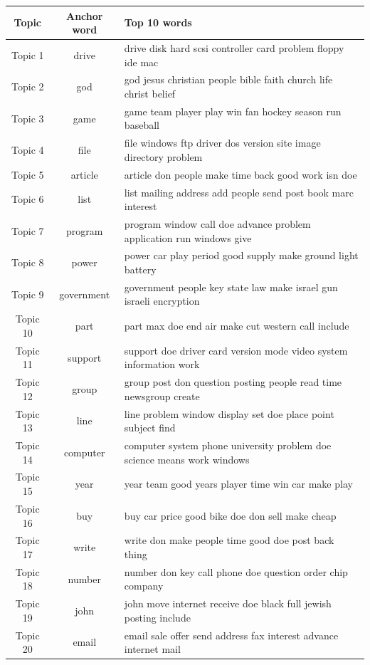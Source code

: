 \documentclass{article}
\begin{document}
\begin{table}[h]
   \begin{center}
  \begin{tabular}{|c|c|l|} \hline
           Topic & Anchor word & Top 10 words \\ \hline
Topic	1	&	drive & drive disk hard scsi controller card problem floppy ide mac	\\ \hline
Topic	2	&	god & god jesus christian people bible faith church life christ belief	\\ \hline
Topic	3	&	game & game team player play win fan hockey season run baseball	\\ \hline
Topic	4	&	file & file windows ftp driver dos version site image directory problem	\\ \hline
Topic	5	&	article & article don people make time back good work isn doe	\\ \hline
Topic	6	&	list & list mailing address add people send post book marc interest	\\ \hline
Topic	7	&	program & program window call doe advance problem application run windows give	\\ \hline
Topic	8	&	power & power car play period good supply make ground light battery	\\ \hline
Topic	9	&	government & government people key state law make israel gun israeli encryption	\\ \hline
Topic	10	&	part & part max doe end air make cut western call include	\\ \hline
Topic	11	&	support & support doe driver card version mode video system information work	\\ \hline
Topic	12	&	group & group post don question posting people read time newsgroup create	\\ \hline
Topic	13	&	line & line problem window display set doe place point subject find	\\ \hline
Topic	14	&	computer & computer system phone university problem doe science means work windows	\\ \hline
Topic	15	&	year & year team good years player time win car make play	\\ \hline
Topic	16	&	buy & buy car price good bike doe don sell make cheap	\\ \hline
Topic	17	&	write & write don make people time good doe post back thing	\\ \hline
Topic	18	&	number & number don key call phone doe question order chip company	\\ \hline
Topic	19	&	john & john move internet receive doe black full jewish posting include	\\ \hline
Topic	20	&	email & email sale offer send address fax interest advance internet mail	\\ \hline


          \end{tabular}

       \label{tab:M700 topics}
   \end{center}
\vspace{-10pt}
\end{table}
\end{document}
